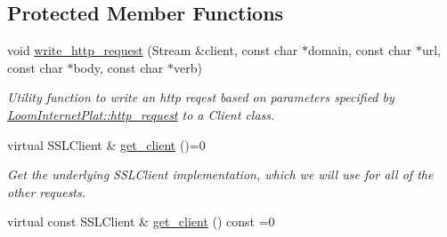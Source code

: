 \subsection*{Protected Member Functions}
\begin{DoxyCompactItemize}
\item 
void \hyperlink{class_loom_internet_plat_a2a6ca5f5f807f420c445dd5ff53aed41}{write\+\_\+http\+\_\+request} (Stream \&client, const char $\ast$domain, const char $\ast$url, const char $\ast$body, const char $\ast$verb)
\begin{DoxyCompactList}\small\item\em Utility function to write an http reqest based on parameters specified by \hyperlink{class_loom_internet_plat_a01a61bd1d5ec547b2619c620abbfd983}{Loom\+Internet\+Plat\+::http\+\_\+request} to a Client class. \end{DoxyCompactList}\item 
virtual S\+S\+L\+Client \& \hyperlink{class_loom_internet_plat_a71bfc232cac5294b1c3e6dbb00029fa7}{get\+\_\+client} ()=0
\begin{DoxyCompactList}\small\item\em Get the underlying S\+S\+L\+Client implementation, which we will use for all of the other requests. \end{DoxyCompactList}\item 
virtual const S\+S\+L\+Client \& \hyperlink{class_loom_internet_plat_a3b79a1467f5f239cd740d6ced88cdadf}{get\+\_\+client} () const =0
\end{DoxyCompactItemize}
